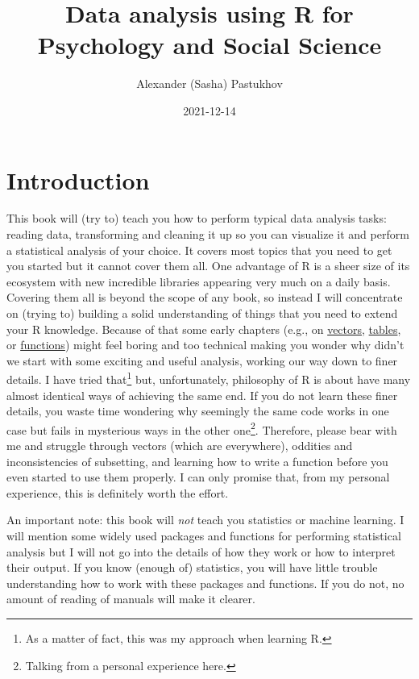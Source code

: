 \documentclass[
]{book}
\title{Data analysis using R for Psychology and Social Science}
\author{Alexander (Sasha) Pastukhov}
\date{2021-12-14}
\begin{document}
\maketitle

{
\setcounter{tocdepth}{1}
\tableofcontents
}
\hypertarget{introduction}{%
\chapter*{Introduction}\label{introduction}}

This book will (try to) teach you how to perform typical data analysis tasks: reading data, transforming and cleaning it up so you can visualize it and perform a statistical analysis of your choice. It covers most topics that you need to get you started but it cannot cover them all. One advantage of R is a sheer size of its ecosystem with new incredible libraries appearing very much on a daily basis. Covering them all is beyond the scope of any book, so instead I will concentrate on (trying to) building a solid understanding of things that you need to extend your R knowledge. Because of that some early chapters (e.g., on \protect\hyperlink{vectors}{vectors}, \protect\hyperlink{tables}{tables}, or \protect\hyperlink{ux5cux23functions}{functions}) might feel boring and too technical making you wonder why didn't we start with some exciting and useful analysis, working our way down to finer details. I have tried that\footnote{As a matter of fact, this was my approach when learning R.} but, unfortunately, philosophy of R is about have many almost identical ways of achieving the same end. If you do not learn these finer details, you waste time wondering why seemingly the same code works in one case but fails in mysterious ways in the other one\footnote{Talking from a personal experience here.}. Therefore, please bear with me and struggle through vectors (which are everywhere), oddities and inconsistencies of subsetting, and learning how to write a function before you even started to use them properly. I can only promise that, from my personal experience, this is definitely worth the effort.

An important note: this book will \emph{not} teach you statistics or machine learning. I will mention some widely used packages and functions for performing statistical analysis but I will not go into the details of how they work or how to interpret their output. If you know (enough of) statistics, you will have little trouble understanding how to work with these packages and functions. If you do not, no amount of reading of manuals will make it clearer.
\end{document}
